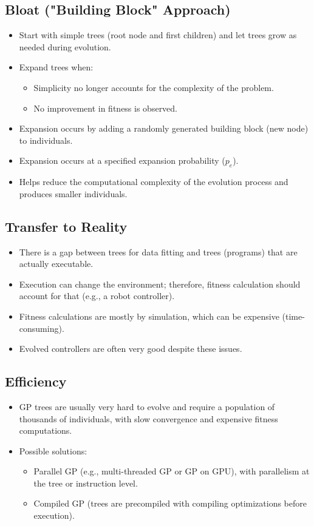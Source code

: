 \subsection*{Bloat ("Building Block" Approach)}
\begin{itemize}
    \item Start with simple trees (root node and first children) and let trees grow as needed during evolution.
    \item Expand trees when:
        \begin{itemize}
            \item Simplicity no longer accounts for the complexity of the problem.
           \item No improvement in fitness is observed.
        \end{itemize}
    \item Expansion occurs by adding a randomly generated building block (new node) to individuals.
     \item Expansion occurs at a specified expansion probability ($p_e$).
   \item Helps reduce the computational complexity of the evolution process and produces smaller individuals.
\end{itemize}

\subsection*{Transfer to Reality}
\begin{itemize}
    \item There is a gap between trees for data fitting and trees (programs) that are actually executable.
     \item Execution can change the environment; therefore, fitness calculation should account for that (e.g., a robot controller).
     \item Fitness calculations are mostly by simulation, which can be expensive (time-consuming).
     \item Evolved controllers are often very good despite these issues.
\end{itemize}

\subsection*{Efficiency}
\begin{itemize}
    \item  GP trees are usually very hard to evolve and require a population of thousands of individuals, with slow convergence and expensive fitness computations.
   \item  Possible solutions:
        \begin{itemize}
           \item  Parallel GP (e.g., multi-threaded GP or GP on GPU), with parallelism at the tree or instruction level.
            \item  Compiled GP (trees are precompiled with compiling optimizations before execution).
        \end{itemize}
\end{itemize}

